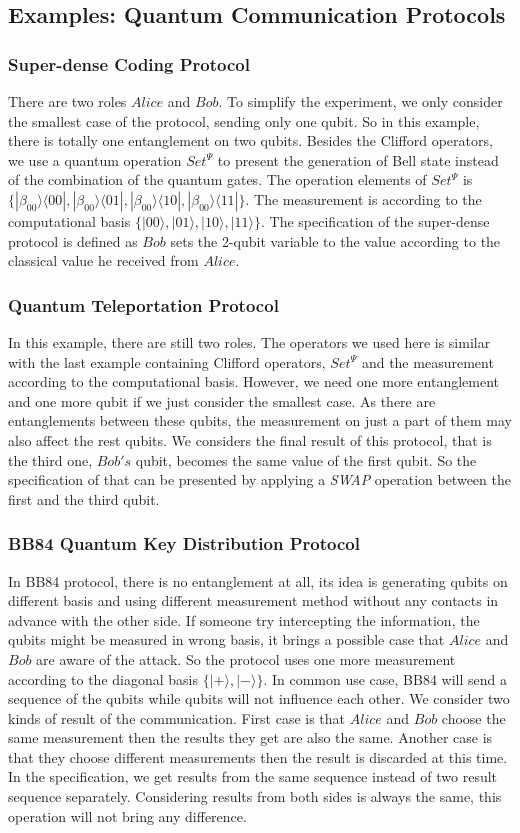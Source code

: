 \documentclass[runningheads]{llncs}
\begin{document}
\subsection{Examples: Quantum Communication Protocols}
\subsubsection{Super-dense Coding Protocol} There are two roles $Alice$ and $Bob$. To simplify the experiment, we only consider the smallest case of the protocol, sending only one qubit. So in this example, there is totally one entanglement on two qubits. Besides the Clifford operators, we use a quantum operation $Set^{\Psi}$ to present the generation of Bell state instead of the combination of the quantum gates. The operation elements of $Set^{\Psi}$ is $\{|\beta_{00}\rangle\langle00|,|\beta_{00}\rangle\langle01|,|\beta_{00}\rangle\langle10|,|\beta_{00}\rangle\langle11|\}$. The measurement is according to the computational basis $\{|00\rangle,|01\rangle,|10\rangle,|11\rangle\}$. The specification of the super-dense protocol is defined as $Bob$ sets the 2-qubit variable to the value according to the classical value he received from $Alice$.
\subsubsection{Quantum Teleportation Protocol} In this example, there are still two roles. The operators we used here is similar with the last example containing Clifford operators, $Set^{\Psi}$ and the measurement according to the computational basis. However, we need one more entanglement and one more qubit if we just consider the smallest case. As there are entanglements between these qubits, the measurement on just a part of them may also affect the rest qubits. We considers the final result of this protocol, that is the third one, $Bob's$ qubit, becomes the same value of the first qubit. So the specification of that can be presented by applying a \textit{SWAP} operation between the first and the third qubit.
\subsubsection{BB84 Quantum Key Distribution Protocol} In BB84 protocol, there is no entanglement at all, its idea is generating qubits on different basis and using different measurement method without any contacts in advance with the other side. If someone try intercepting the information, the qubits might be measured in wrong basis, it brings a possible case that $Alice$ and $Bob$ are aware of the attack. So the protocol uses one more measurement according to the diagonal basis $\{|+\rangle,|-\rangle\}$. In common use case, BB84 will send a sequence of the qubits while qubits will not influence each other. We consider two kinds of result of the communication. First case is that $Alice$ and $Bob$ choose the same measurement then the results they get are also the same. Another case is that they choose different measurements then the result is discarded at this time. In the specification, we get results from the same sequence instead of two result sequence separately. Considering results from both sides is always the same, this operation will not bring any difference.
\end{document}
